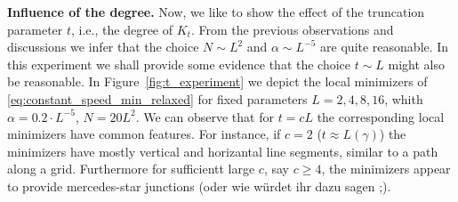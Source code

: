 \documentclass[%
a4paper,11pt,DIV=11,%
abstract=on%
]{scrartcl}
\begin{document}
\textbf{Influence of the degree.} Now, we like to show the effect of the truncation parameter $t$, i.e., the degree of $K_{t}$. From the previous observations and discussions we infer that the choice $N \sim L^{2}$ and $\alpha \sim L^{-5}$ are quite reasonable. In this experiment we shall provide some evidence that the choice $t \sim L$ might also be reasonable.
In Figure~\ref{fig:t_experiment} we depict the local minimizers of \eqref{eq:constant_speed_min_relaxed} for fixed parameters $L=2,4,8,16$, whith $\alpha = 0.2 \cdot L^{-5}$, $N=20 L^{2}$. We can observe that for $t = c L$ the corresponding local minimizers have common features. For instance, if $c=2$ ($t \approx L(\gamma)$) the minimizers have mostly vertical and horizantal line segments, similar to a path along a grid. Furthermore for sufficientt large $c$, say $c\ge 4$, the minimizers appear to provide {\color{blue} mercedes-star junctions (oder wie würdet ihr dazu sagen ;)}. 
\end{document}
